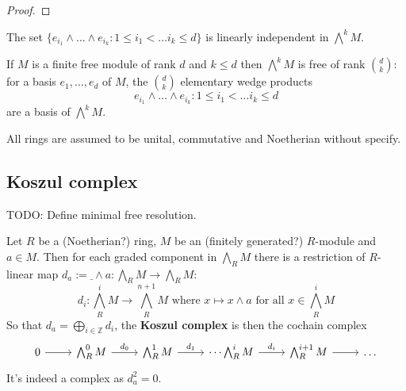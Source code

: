 \begin{proof}
    
\end{proof}

\begin{lemma}
    \label{lem:lin_indep_exterior_power}
    The set $\{e_{i_1} \wedge \dots \wedge e_{i_k} : 1 \leq i_1 < \dots i_k \leq d\}$ is linearly independent in $\bigwedge^k M$.
\end{lemma}

\begin{theorem}
    \label{thm:exterior_power_basis_if_finite_free_module}
    If $M$ is a finite free module of rank $d$ and $k \leq d$ then $\bigwedge^k M$ is free of rank $\binom{d}{k}$: for a basis $e_1, \dots, e_d$ of $M$, the $\binom{d}{k}$ elementary wedge products 
    \[
        e_{i_1} \wedge \dots \wedge e_{i_k} : 1 \leq i_1 < \dots i_k \leq d
    \]
    are a basis of $\bigwedge^k M$.
\end{theorem}

All rings are assumed to be unital, commutative and Noetherian without specify.

\subsection{Koszul complex}

\begin{definition}
	\label{def:minimal_free_resl}
	TODO: Define minimal free resolution.
\end{definition}


\begin{proposition}
	\label{prop:loc_resl_min_iff_basis_to_gen}
\end{proposition}


\begin{definition}[KoszulComplex]
	\label{def:KoszulComplex}
	\leanok
	Let $R$ be a (Noetherian?) ring, $M$ be an (finitely generated?) $R$-module and $a \in M$.
	Then for each graded component in $\bigwedge_R M$ there is a restriction of $R$-linear map $d_a := \underline{\ } \wedge a: \bigwedge_R M \to \bigwedge_R M$:
	$$d_i: \bigwedge_R^i M \to \bigwedge_R^{n+1}M \text{ where } x \mapsto x \wedge a \text{ for all } x \in \bigwedge_{R}^i M$$
	So that $d_a = \bigoplus_{i \in \mathbb{Z}}d_i$, the \textbf{Koszul complex} is then the cochain complex
	$$\begin{tikzcd}
		0 \arrow[r] & \bigwedge^{0}_R M \arrow[r, "d_{0}"] & \bigwedge^1_R M \arrow[r, "d_1"] & \dots \bigwedge_R^i M\arrow[r, "d_i"] & \bigwedge_R^{i+1} M \arrow[r] & \dots
	\end{tikzcd}$$
	It's indeed a complex as $d_a^2 = 0$.
\end{definition}

